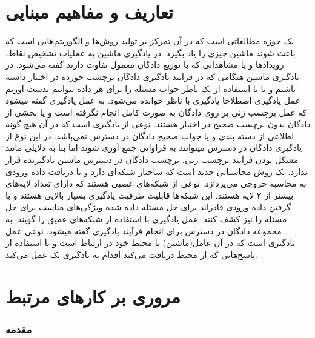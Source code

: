 \documentclass[12pt,a4paper]{report}
\theoremstyle{definition}
\theoremstyle{theorem}
\theoremstyle{definition}
\begin{document}
	\chapter{تعاریف و مفاهیم مبنایی}
		یک حوزه مطالعاتی است که در آن تمرکز بر تولید روش‌ها و الگوریتم‌هایی است که باعث شوند ماشین چیزی را یاد بگیرد.
		در یادگیری ماشین به عملیات تشخیص نقاط، رویدادها و یا مشاهداتی که با توزیع دادگان معمول تفاوت دارند گفته می‌شود.
در یادگیری ماشین هنگامی که در فرایند یادگیری دادگان برچسب خورده در اختیار داشته باشیم و یا با استفاده از یک ناظر جواب مسئله را برای هر داده بتوانیم بدست آوریم عمل یادگیری اصطلاحا یادگیری با ناظر خوانده می‌شود.
به عمل یادگیری گفته میشود که عمل برچسب زنی بر روی دادگان به صورت کامل انجام نگرفته است و یا بخشی از دادگان بدون برچسب صحیح در اختیار هستند.
نوعی از یادگیری است که در آن هیچ گونه اطلاعی از دسته بندی و یا جواب صحیح دادگان در دسترس نمی‌باشد. در این نوع از یادگیری دادگان در دسترس میتوانند به فراوانی جمع آوری شوند اما بنا به دلایلی مانند مشکل بودن فرایند برچسب زنی، برچسب دادگان در دسترس ماشین یادگیرنده قرار ندارد.
یک روش محاسباتی جدید است که ساختار شبکه‌ای دارد و با دریافت داده ورودی به محاسبه خروجی می‌پردازد.
نوعی از شبکه‌های عصبی هستند که دارای تعداد لایه‌های بیشتر از ۲ لایه هستند. این شبکه‌ها قابلیت ظرفیت یادگیری بسیار بالایی هستند و با گرفتن داده ورودی قادراند برای حل مسئله داده شده ویژگی‌های مناسب برای حل مسئله را نیز کشف کنند.
عمل یادگیری با استفاده از شبکه‌های عمیق را گویند.
به مجموعه دادگان در دسترس برای انجام فرآیند یادگیری گفته میشود.
نوعی عمل یادگیری است که در آن عامل(ماشین) با محیط خود در ارتباط است و با استفاده از پاسخ‌هایی که از محیط دریافت می‌کند اقدام به یادگیری یک عمل می‌کند.
	\chapter{مروری بر کار‌های مرتبط}
	\subsection{مقدمه}
\end{document}
